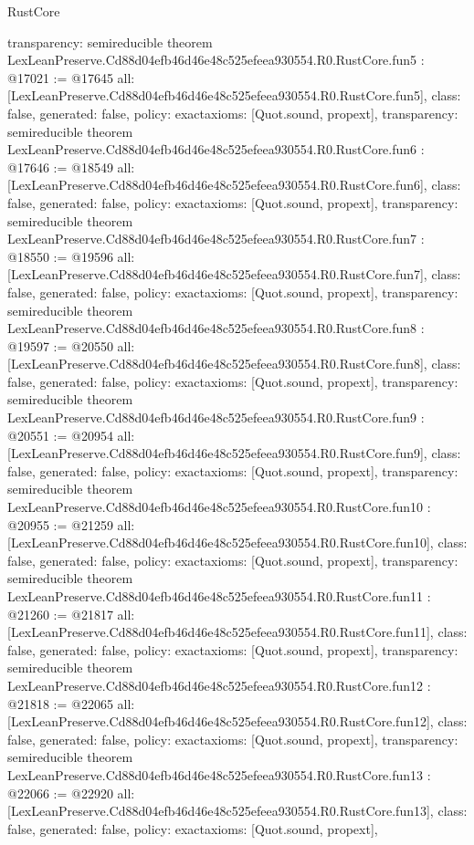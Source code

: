 \begin{lexlean}{RustCore}
\begin{coremodule}
{  transparency: semireducible
}
theorem LexLeanPreserve.Cd88d04efb46d46e48c525efeea930554.R0.RustCore.fun5 : @17021 := @17645 {
  all: [LexLeanPreserve.Cd88d04efb46d46e48c525efeea930554.R0.RustCore.fun5],
  class: false,
  generated: false,
  policy: exact{axioms: [Quot.sound, propext]},
  transparency: semireducible
}
theorem LexLeanPreserve.Cd88d04efb46d46e48c525efeea930554.R0.RustCore.fun6 : @17646 := @18549 {
  all: [LexLeanPreserve.Cd88d04efb46d46e48c525efeea930554.R0.RustCore.fun6],
  class: false,
  generated: false,
  policy: exact{axioms: [Quot.sound, propext]},
  transparency: semireducible
}
theorem LexLeanPreserve.Cd88d04efb46d46e48c525efeea930554.R0.RustCore.fun7 : @18550 := @19596 {
  all: [LexLeanPreserve.Cd88d04efb46d46e48c525efeea930554.R0.RustCore.fun7],
  class: false,
  generated: false,
  policy: exact{axioms: [Quot.sound, propext]},
  transparency: semireducible
}
theorem LexLeanPreserve.Cd88d04efb46d46e48c525efeea930554.R0.RustCore.fun8 : @19597 := @20550 {
  all: [LexLeanPreserve.Cd88d04efb46d46e48c525efeea930554.R0.RustCore.fun8],
  class: false,
  generated: false,
  policy: exact{axioms: [Quot.sound, propext]},
  transparency: semireducible
}
theorem LexLeanPreserve.Cd88d04efb46d46e48c525efeea930554.R0.RustCore.fun9 : @20551 := @20954 {
  all: [LexLeanPreserve.Cd88d04efb46d46e48c525efeea930554.R0.RustCore.fun9],
  class: false,
  generated: false,
  policy: exact{axioms: [Quot.sound, propext]},
  transparency: semireducible
}
theorem LexLeanPreserve.Cd88d04efb46d46e48c525efeea930554.R0.RustCore.fun10 : @20955 := @21259 {
  all: [LexLeanPreserve.Cd88d04efb46d46e48c525efeea930554.R0.RustCore.fun10],
  class: false,
  generated: false,
  policy: exact{axioms: [Quot.sound, propext]},
  transparency: semireducible
}
theorem LexLeanPreserve.Cd88d04efb46d46e48c525efeea930554.R0.RustCore.fun11 : @21260 := @21817 {
  all: [LexLeanPreserve.Cd88d04efb46d46e48c525efeea930554.R0.RustCore.fun11],
  class: false,
  generated: false,
  policy: exact{axioms: [Quot.sound, propext]},
  transparency: semireducible
}
theorem LexLeanPreserve.Cd88d04efb46d46e48c525efeea930554.R0.RustCore.fun12 : @21818 := @22065 {
  all: [LexLeanPreserve.Cd88d04efb46d46e48c525efeea930554.R0.RustCore.fun12],
  class: false,
  generated: false,
  policy: exact{axioms: [Quot.sound, propext]},
  transparency: semireducible
}
theorem LexLeanPreserve.Cd88d04efb46d46e48c525efeea930554.R0.RustCore.fun13 : @22066 := @22920 {
  all: [LexLeanPreserve.Cd88d04efb46d46e48c525efeea930554.R0.RustCore.fun13],
  class: false,
  generated: false,
  policy: exact{axioms: [Quot.sound, propext]},
}
\end{coremodule}
\end{lexlean}
